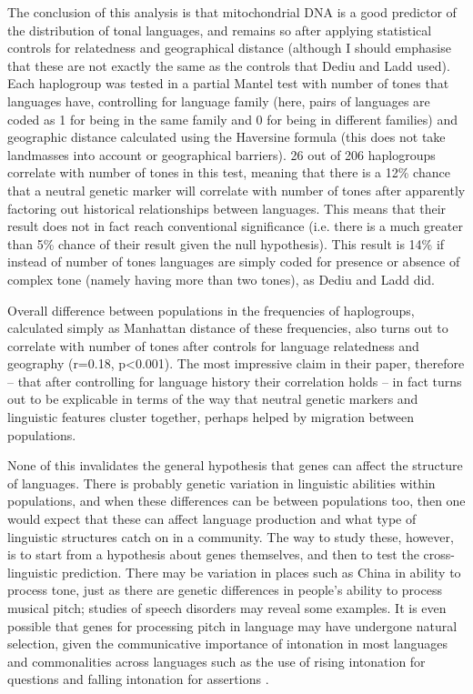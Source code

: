 \documentclass[output=paper]{langsci/langscibook}
\begin{document}
   The conclusion of this analysis is that mitochondrial DNA is a
good predictor of the distribution of tonal languages, and remains so after applying statistical
controls for relatedness and geographical distance (although I should emphasise that these are not
exactly the same as the controls that Dediu and Ladd used).  Each haplogroup was tested in a partial Mantel test with number of tones that languages have, controlling for language family (here, pairs of languages are coded as 1 for being in the same family and 0 for being in different families) and geographic distance calculated using the Haversine formula (this does not take landmasses into account or geographical barriers).  26 out of 206 haplogroups correlate with number of tones in this test, meaning that there is a 12\% chance that a neutral genetic marker will correlate with number of tones after apparently factoring out historical relationships between languages.  This means that their result does not in fact reach conventional significance (i.e. there is a much greater than 5\% chance of their result given the null hypothesis).  This result is 14\% if instead of number of tones languages are simply coded for presence or absence of complex tone (namely having more than two tones), as Dediu and Ladd did.  



Overall difference between populations in the frequencies of haplogroups, calculated simply as Manhattan distance of these frequencies, also turns out to correlate with number of tones after controls for language relatedness and geography (r=0.18, p{\textless}0.001).  The most impressive claim in their paper, therefore – that after controlling for language history their correlation holds – in fact turns out to be explicable in terms of the way that neutral genetic markers and linguistic features cluster together, perhaps helped by migration between populations. 



None of this invalidates the general hypothesis that genes can affect the structure of languages.  There is probably genetic variation in linguistic abilities within populations, and when these differences can be between populations too, then one would expect that these can affect language production and what type of linguistic structures catch on in a community.  The way to study these, however, is to start from a hypothesis about genes themselves, and then to test the cross-linguistic prediction.  There may be variation in places such as China in ability to process tone, just as there are genetic differences in people’s ability to process musical pitch; studies of speech disorders may reveal some examples.  It is even possible that genes for processing pitch in language may have undergone natural selection, given the communicative importance of intonation in most languages \citep{Cruttenden1997} and commonalities across
languages such as the use of rising intonation for questions and falling intonation for assertions \citep{Dryer2013polarquestions}. 
\end{document}
